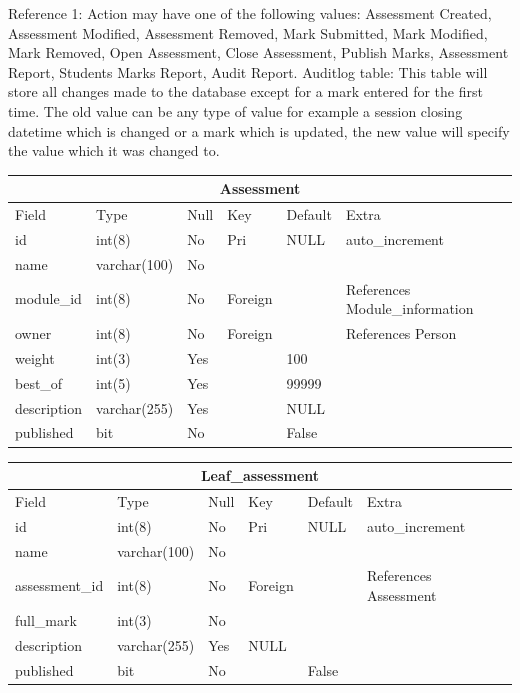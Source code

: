 Reference 1: Action may have one of the following values: Assessment Created, Assessment Modified, Assessment Removed, Mark Submitted, Mark Modified, Mark Removed, Open Assessment, Close Assessment, Publish Marks, Assessment Report, Students Marks Report, Audit Report.
Auditlog table:
This table will store all changes made to the database except for a mark entered for the first time. The old value can be any type of value for example a session closing datetime which is changed or a mark which is updated, the new value will specify the value which it was changed to.

\begin{table}[ht]
\begin{tabular}[c]{|p{3cm}||p{2.1cm}||p{1.2cm}||p{1.5cm}||p{2cm}|p{4cm}|}
  \hline
  \multicolumn{6}{|c|}{Assessment} \\
  \hline 
  Field & Type & Null & Key & Default & Extra \\ [0.5ex] %
  \hline
  id & int(8) & No & Pri & NULL & auto\_increment \\
  name & varchar(100) & No & & & \\
  module\_id & int(8) & No & Foreign & & References Module\_information \\
  owner & int(8) & No & Foreign & & References Person \\
  weight & int(3) & Yes & & 100 & \\
  best\_of & int(5) & Yes & & 99999 & \\
  description & varchar(255) & Yes & & NULL & \\
  published & bit & No & & False & \\
  \hline
\end{tabular}
\end{table} 

\begin{table}[ht]
\begin{tabular}[c]{|p{3cm}||p{2.1cm}||p{1.2cm}||p{1.5cm}||p{2cm}|p{4cm}|}
  \hline
  \multicolumn{6}{|c|}{Leaf\_assessment} \\
  \hline 
  Field & Type & Null & Key & Default & Extra \\ [0.5ex] %
  \hline
  id & int(8) & No & Pri & NULL & auto\_increment \\
  name & varchar(100) & No & & & \\
  assessment\_id & int(8) & No & Foreign & & References Assessment \\
  full\_mark & int(3) & No & & & \\
  description & varchar(255) & Yes & NULL & & \\
  published & bit & No & & False & \\
  \hline
\end{tabular}
\end{table} 

